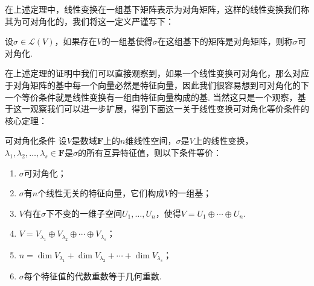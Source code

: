 在上述定理中，线性变换在一组基下矩阵表示为对角矩阵，这样的线性变换我们称其为可对角化的，我们将这一定义严谨写下：
\begin{definition}{}{}
    设$\sigma\in\mathcal{L}(V)$，如果存在$V$的一组基使得$\sigma$在这组基下的矩阵是对角矩阵，则称$\sigma$可对角化.
\end{definition}

在上述定理的证明中我们可以直接观察到，如果一个线性变换可对角化，那么对应于对角矩阵的基中每一个向量必然是特征向量，因此我们很容易想到可对角化的下一个等价条件就是线性变换有一组由特征向量构成的基. 当然这只是一个观察，基于这一观察我们可以进一步扩展，得到下面这一关于线性变换可对角化等价条件的核心定理：
\begin{theorem}{}{可对角化条件}
    设$V$是数域$\mathbf{F}$上的$n$维线性空间，$\sigma$是$V$上的线性变换，$\lambda_1,\lambda_2,\ldots,\lambda_s\in\mathbf{F}$是$\sigma$的所有互异特征值，则以下条件等价：
    \begin{enumerate}
        \item \label{item:16:可对角化条件:1}
              $\sigma$可对角化；

        \item \label{item:16:可对角化条件:2}
              $\sigma$有$n$个线性无关的特征向量，它们构成$V$的一组基；

        \item \label{item:16:可对角化条件:3}
              $V$有在$\sigma$下不变的一维子空间$U_1,\ldots,U_n$，使得$V=U_1\oplus\cdots\oplus U_n$.

        \item \label{item:16:可对角化条件:4}
              $V=V_{\lambda_1}\oplus V_{\lambda_2}\oplus\cdots\oplus V_{\lambda_s}$；

        \item \label{item:16:可对角化条件:5}
              $n=\dim V_{\lambda_1}+\dim V_{\lambda_2}+\cdots+\dim V_{\lambda_s}$；

        \item \label{item:16:可对角化条件:6}
              $\sigma$每个特征值的代数重数等于几何重数.
    \end{enumerate}
\end{theorem}

